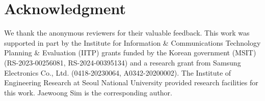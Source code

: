 \section*{Acknowledgment}
%
We thank the anonymous reviewers for their valuable feedback.
%
This work was supported in part by the Institute for Information \&
Communications Technology Planning \& Evaluation (IITP) grants funded by the
Korean government (MSIT) (RS-2023-00256081, RS-2024-00395134) and a
research grant from Samsung Electronics Co., Ltd. (0418-20230064, A0342-20200002).
%
The Institute of Engineering Research at Seoul National University provided
research facilities for this work. Jaewoong Sim is the corresponding author.


